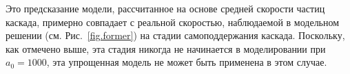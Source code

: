 
Это предсказание модели, рассчитанное на основе средней скорости частиц каскада, примерно совпадает с реальной скоростью, наблюдаемой в модельном решении (см. Рис.~\ref{fig.former}) на стадии самоподдержания каскада.
Поскольку, как отмечено выше, эта стадия никогда не начинается в моделировании при $a_0 = 1000$, эта упрощенная модель не может быть применена в этом случае.


